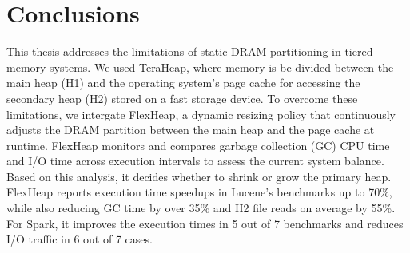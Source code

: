 \section{Conclusions}


This thesis addresses the limitations of static DRAM partitioning in tiered memory systems. We used TeraHeap, 
where memory is be divided between the main heap (H1) and the operating system’s page cache for 
accessing the secondary heap (H2) stored on a fast storage device. To overcome these limitations, we intergate 
FlexHeap, a dynamic resizing policy that continuously adjusts the DRAM partition between the main heap and 
the page cache at runtime. FlexHeap monitors and compares garbage collection (GC) CPU time and I/O time across 
execution intervals to assess the current system balance. Based on this analysis, it decides whether to shrink or 
grow the primary heap.
FlexHeap reports execution time speedups in Lucene’s benchmarks up to 70\%, 
while also reducing GC time by over 35\% and H2 file reads on average by 55\%.
For Spark, it improves the execution times in 5 out of 7 benchmarks and reduces I/O traffic in 6 out of 7 cases. 
